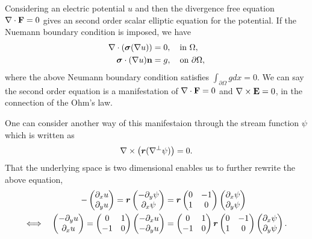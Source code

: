 \documentclass[11pt]{amsart}
\theoremstyle{plain}
\theoremstyle{remark}
\numberwithin{equation}{section}
\numberwithin{Thm}{section}
\def\F{{\bf F}}
\def\E{{\bf E}}
\def\r{{\bf r}}
\def\n{{\bf n}}
\def\Sigma{\mbox{\boldmath$\sigma$}}
\def\r{\mbox{\boldmath$r$}}
\begin{document}
Considering an electric potential $u$ and then the divergence free equation $\nabla\cdot\F=0$ gives an second order scalar elliptic equation for the potential. If the Nuemann boundary condition is imposed, we have
\begin{align}
\nabla\cdot(\Sigma(\nabla u))  &=0, \quad \text{in $\Omega$},\label{ellipticeqn}\\
\Sigma\cdot(\nabla u)\n&=g, \quad \text{on $\partial\Omega$},\label{Nuemann}
\end{align}
where the above Neumann boundary condition satisfies $\int_{\partial\Omega}gdx=0$. We can say the second order equation is a manifestation of $\nabla\cdot\F=0$ and $\nabla\times\E=0$, in the connection of the Ohm's law. 

One can consider another way of this manifestaion through the stream function $\psi$ which is written as
\begin{equation}\label{curlfreeA}
\nabla\times\big(\r(\nabla^\perp\psi)\big)=0.
\end{equation}
That the underlying space is two dimensional enables us to further rewrite the above equation,
\begin{align*}
-\begin{pmatrix} \partial_x u \\ \partial_y u \end{pmatrix}
=\r \begin{pmatrix} -\partial_y \psi \\ \partial_x \psi \end{pmatrix}
&=\r \begin{pmatrix} 0 & -1 \\ 1 & 0 \end{pmatrix} \begin{pmatrix} \partial_x \psi \\  \partial_y \psi \end{pmatrix}\\
\Longleftrightarrow \quad \begin{pmatrix} -\partial_y u \\ \partial_x u \end{pmatrix} = \begin{pmatrix} 0 & 1 \\ -1 & 0 \end{pmatrix} \begin{pmatrix} -\partial_x u \\ -\partial_y u \end{pmatrix}  &=  \begin{pmatrix} 0 & 1 \\ -1 & 0 \end{pmatrix} \r \begin{pmatrix} 0 & -1 \\ 1 & 0 \end{pmatrix} \begin{pmatrix} \partial_x \psi \\  \partial_y \psi \end{pmatrix}.
\end{align*}
\end{document}

